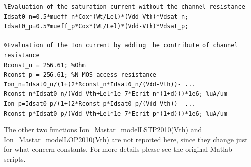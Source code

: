 \begin{lstlisting}
%Evaluation of the saturation current without the channel resistance
Idsat0_n=0.5*mueff_n*Cox*(Wt/Lel)*(Vdd-Vth)*Vdsat_n;
Idsat0_p=0.5*mueff_p*Cox*(Wt/Lel)*(Vdd-Vth)*Vdsat_p;

%Evaluation of the Ion current by adding the contribute of channel resistance
Rconst_n = 256.61; %Ohm
Rconst_p = 256.61; %N-MOS access resistance
Ion_n=Idsat0_n/(1+(2*Rconst_n*Idsat0_n/(Vdd-Vth))- ...
Rconst_n*Idsat0_n/(Vdd-Vth+Lel*1e-7*Ecrit_n*(1+d)))*1e6; %uA/um
Ion_p=Idsat0_p/(1+(2*Rconst_p*Idsat0_p/(Vdd-Vth))- ...
Rconst_p*Idsat0_p/(Vdd-Vth+Lel*1e-7*Ecrit_p*(1+d)))*1e6; %uA/um
\end{lstlisting}
The other two functions Ion\_Mastar\_modelLSTP2010(Vth) and Ion\_Mastar\_modelLOP2010(Vth) are not reported here, since they change just for what concern constants. For more details please see the original Matlab scripts.